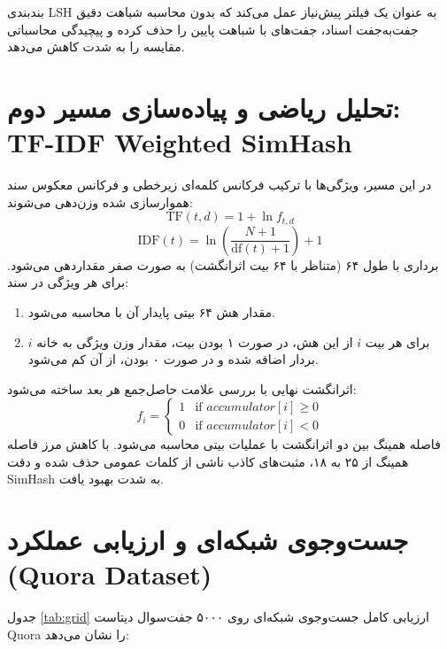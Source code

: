 \documentclass[12pt,onecolumn,a4paper]{article}
\begin{document}
\begin{invariantbox}
بندبندی LSH به عنوان یک فیلتر پیش‌نیاز عمل می‌کند که بدون محاسبه شباهت دقیق جفت‌به‌جفت اسناد، جفت‌های با شباهت پایین را حذف کرده و پیچیدگی محاسباتی مقایسه را به شدت کاهش می‌دهد.
\end{invariantbox}

\section{تحلیل ریاضی و پیاده‌سازی مسیر دوم: TF-IDF Weighted SimHash}

در این مسیر، ویژگی‌ها با ترکیب فرکانس کلمه‌ای زیرخطی و فرکانس معکوس سند هموارسازی شده وزن‌دهی می‌شوند:
\[
\text{TF}(t,d) = 1 + \ln f_{t,d}
\]
\[
\text{IDF}(t) = \ln\left(\frac{N+1}{\text{df}(t)+1}\right) + 1
\]
برداری با طول ۶۴ (متناظر با ۶۴ بیت اثرانگشت) به صورت صفر مقداردهی می‌شود. برای هر ویژگی در سند:
\begin{enumerate}
\item مقدار هش ۶۴ بیتی پایدار آن با  محاسبه می‌شود.
\item برای هر بیت $i$ از این هش، در صورت ۱ بودن بیت، مقدار وزن ویژگی به خانه $i$ بردار اضافه شده و در صورت ۰ بودن، از آن کم می‌شود.
\end{enumerate}
اثرانگشت نهایی با بررسی علامت حاصل‌جمع هر بعد ساخته می‌شود:
\[
f_i = 
\begin{cases} 
1 & \text{if } accumulator[i] \ge 0 \\
0 & \text{if } accumulator[i] < 0 
\end{cases}
\]
فاصله همینگ بین دو اثرانگشت با عملیات بیتی  محاسبه می‌شود. با کاهش مرز فاصله همینگ از ۲۵ به ۱۸، مثبت‌های کاذب ناشی از کلمات عمومی حذف شده و دقت SimHash به شدت بهبود یافت.

\section{جست‌وجوی شبکه‌ای و ارزیابی عملکرد (Quora Dataset)}

جدول \ref{tab:grid} ارزیابی کامل جست‌وجوی شبکه‌ای روی ۵۰۰۰ جفت‌سوال دیتاست Quora را نشان می‌دهد:
\end{document}
